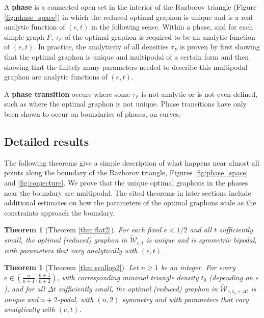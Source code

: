 \documentclass[12pt]{amsart}
\newtheorem{theorem}[lemma]{Theorem}
\newcommand{\tdens}{\tau}
\newcommand{\B}{\mathbb{B}}
\newcommand{\reduced}{\widetilde {\mathcal{W}}}
\begin{document}
{A {\bf phase} is a connected open set in the interior of the Razborov triangle (Figure \ref{fig:phase_space}) in which the reduced optimal graphon
is unique and is a real analytic function of $(e,t)$ in
the following sense. 
Within a phase, and for each simple graph $F$, $\tdens_F$ of the
optimal graphon is required to be an analytic function of $(e,t)$.
In practice, the analyticity of all densities 
$\tdens_F$ is proven by first
showing that the optimal graphon is unique and 
multipodal of a certain form and then showing that
the finitely many parameters needed to describe this
multipodal graphon are analytic functions of $(e,t)$. 

A {\bf phase transition} occurs where some $\tdens_F$ is not
analytic or is not even defined, such as where the optimal graphon is not unique. 
Phase transitions have only been shown to occur on boundaries of phases, on curves.

\subsection{\label{detailed results}{Detailed results}} The following theorems give a simple description
of what happens near
almost all points along the boundary of the Razborov triangle, Figures \ref{fig:phase_space} and \ref{fig:conjecture}. We prove that the unique optimal graphons in the phases near the boundary are multipodal. The
cited theorems in later sections include additional estimates on 
how the parameters of the optimal graphons scale as the constraints approach the boundary. 

\begin{theorem}[Theorem \ref{thm:flat2}] \label{thm:flat}
For each fixed $e<1/2$ and all $t$ sufficiently small, the 
optimal (reduced) graphon in $\reduced_{e,t}$ is unique and is symmetric bipodal, with parameters that vary analytically with $(e,t)$.
\end{theorem} 

\begin{theorem}[Theorem \ref{thm:scallop2}] \label{thm:scallop}
Let $n \ge 1$ be an integer. For every $e \in \left ( \frac{n}{n+1}, \frac{n+1}{n+2}\right )$, with 
corresponding minimal triangle density $t_0$ (depending on $e$), 
and for all
$\Delta t$ sufficiently small, the optimal (reduced) graphon in $\reduced_{e, t_0 + \Delta t}$
is unique and $n+2$-podal, with $(n,2)$ symmetry and with parameters that vary analytically with $(e,t)$. 
\end{theorem}

}
\end{document}
